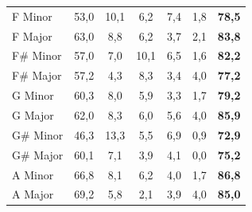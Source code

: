 \begin{table}[htpb]
{\begin{tabular}{@{}lcccccc@{}}
        F Minor  & 53,0 & 10,1 & 6,2  & 7,4  & 1,8 & \textbf{78,5} \\
        F Major  & 63,0 & 8,8  & 6,2  & 3,7  & 2,1 & \textbf{83,8} \\
        F\# Minor & 57,0 & 7,0  & 10,1 & 6,5  & 1,6 & \textbf{82,2} \\
        F\# Major & 57,2 & 4,3  & 8,3  & 3,4  & 4,0 & \textbf{77,2} \\
        G Minor  & 60,3 & 8,0  & 5,9  & 3,3  & 1,7 & \textbf{79,2} \\
        G Major  & 62,0 & 8,3  & 6,0  & 5,6  & 4,0 & \textbf{85,9} \\
        G\# Minor & 46,3 & 13,3 & 5,5  & 6,9  & 0,9 & \textbf{72,9} \\
        G\# Major & 60,1 & 7,1  & 3,9  & 4,1  & 0,0 & \textbf{75,2} \\
        A Minor  & 66,8 & 8,1  & 6,2  & 4,0  & 1,7 & \textbf{86,8} \\
        A Major  & 69,2 & 5,8  & 2,1  & 3,9  & 4,0 & \textbf{85,0} \\
        \bottomrule
    \end{tabular}%
    } %
\end{table}